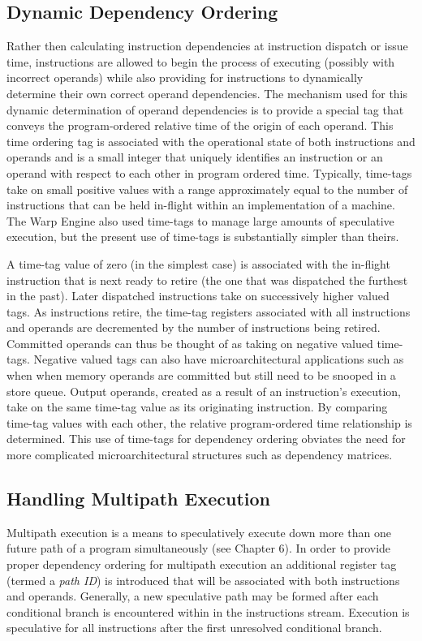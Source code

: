 \documentclass{book}
\begin{document}
\subsection{Dynamic Dependency Ordering}
%
Rather then calculating instruction dependencies at instruction
dispatch or issue time, instructions are allowed to begin
the process of executing (possibly with incorrect operands)
while also providing for instructions to
dynamically determine their own correct
operand dependencies.
The mechanism used for this dynamic determination of
operand dependencies is to provide a special tag that
conveys the program-ordered relative time of the origin of
each operand.
This time ordering tag is associated
with the operational state of both instructions 
and operands and is a small integer that 
uniquely identifies an instruction
or an operand with respect to each other in program ordered time.
Typically, time-tags take on small positive values with
a range approximately equal to the 
number of instructions that can be held in-flight within an
implementation of a machine.  
The Warp Engine \cite{Cle95}
also used time-tags to manage large amounts of speculative execution,
but the present use of time-tags is substantially simpler than theirs.

A time-tag value of zero (in the simplest case) is associated with the
in-flight instruction that is next ready
to retire (the one that was dispatched the furthest in the past).
Later dispatched instructions take on successively higher
valued tags.
As instructions retire, the time-tag registers associated
with all instructions and operands
are decremented by the
number of instructions being retired.
Committed operands can thus be thought of as taking on
negative valued time-tags.  Negative valued tags can also have
microarchitectural applications such as when
when memory operands are committed but
still need to be snooped in a store queue.
Output operands, created as a result of an instruction's execution,
take on
the same time-tag value as its originating instruction.  
By comparing time-tag values with each other, the relative
program-ordered time relationship is determined.
This use of time-tags for dependency ordering obviates the
need for more complicated microarchitectural structures such
as dependency matrices. \cite{tjaden73matrices}
%
%
\subsection{Handling Multipath Execution}
%
Multipath execution is a means to speculatively
execute down more than one future path of a program simultaneously
(see Chapter 6).
In order to provide proper dependency ordering for
multipath execution an additional register tag 
(termed a \textit{path ID}) is introduced
that will be associated with both instructions and operands.
Generally, a new speculative path may be formed
after each conditional branch is encountered within
in the instructions stream.  Execution is
speculative for all instructions after
the first unresolved conditional branch.
\end{document}
